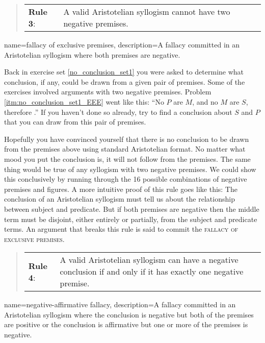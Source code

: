 \begin{quotation}
\begin{tabu}{p{.1\linewidth}p{.9\linewidth}}
\textbf{Rule 3}: & A valid Aristotelian syllogism cannot have two negative premises.
\end{tabu}\label{rule_3}
\end{quotation}

{
name=fallacy of exclusive premises,
description={A fallacy committed in an Aristotelian syllogism where both premises are negative.}
}

Back in exercise set \ref{no_conclusion_set1} you were asked to determine what conclusion, if any, could be drawn from a given pair of premises. Some of the exercises involved arguments with two negative premises. Problem \ref{itm:no_conclusion_set1_EEE} went like this: ``No $P$ are $M$, and no $M$ are $S$, therefore \underline{\hspace{2cm}}.'' If you haven't done so already, try to find a conclusion about $S$ and $P$ that you can draw from this pair of premises.

Hopefully you have convinced yourself that there is no conclusion to be drawn  from the premises above using standard Aristotelian format. No matter what mood you put the conclusion is, it will not follow from the premises. The same thing would be true of any syllogism with two negative premises. We could show this conclusively by running through the 16 possible combinations of negative premises and figures. A more intuitive proof of this rule goes like this: The conclusion of an Aristotelian syllogism must tell us about the relationship between subject and predicate. But if both premises are negative then the middle term must be disjoint, either entirely or partially, from the subject and predicate terms. An argument that breaks this rule is said to commit the \textsc{\gls{fallacy of exclusive premises}}. \label{def:exclusive_premises}


\begin{quotation}
\begin{tabu}{p{.1\linewidth}p{.9\linewidth}}
\textbf{Rule 4}: & A valid Aristotelian syllogism can have a negative conclusion if and only if it has exactly one negative premise.
\end{tabu} \label{rule_4}
\end{quotation}
\label{rule4}

{
name=negative-affirmative  fallacy,
description={A fallacy committed in an Aristotelian syllogism where the conclusion is negative but both of the premises are positive or the conclusion is affirmative but one or more of the premises is negative.}
}

